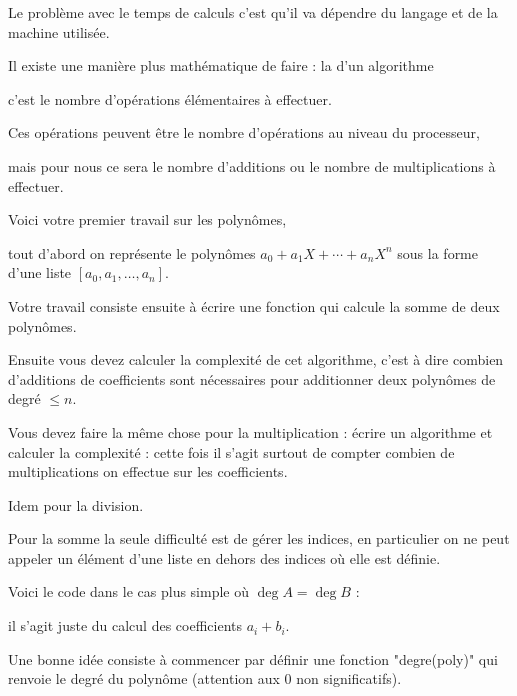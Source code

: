 \change

Le problème avec le temps de calculs c'est qu'il va dépendre 
du langage et de la machine utilisée. 

\change

Il existe une manière plus mathématique de faire : 
la  d'un algorithme


\change

c'est le nombre d'opérations élémentaires à effectuer.

\change

Ces opérations peuvent être le nombre d'opérations au niveau du processeur, 

mais pour nous ce sera le nombre d'additions ou le nombre de multiplications
à effectuer.



\diapo


Voici votre premier travail sur les polynômes,

tout d'abord on représente le polynômes $a_0+a_1X+\cdots + a_n X^n$ 
sous la forme d'une liste $[a_0,a_1,\ldots,a_n]$.


Votre travail consiste ensuite à écrire une fonction qui calcule la somme 
de deux polynômes.

Ensuite vous devez calculer la complexité de cet algorithme, c'est à dire combien d'additions
de coefficients sont nécessaires pour additionner deux polynômes de degré $\le n$.

Vous devez faire la même chose pour la multiplication : écrire un algorithme et calculer la complexité :
cette fois il s'agit surtout de compter combien de multiplications  on effectue sur les coefficients.

Idem pour la division.



\diapo

Pour la somme la seule difficulté est de gérer les indices, en particulier on ne peut
  appeler un élément d'une liste en dehors des indices où elle est définie.
  
  Voici le code dans le cas plus simple où $\deg A = \deg B$ :  

  il s'agit juste du calcul des coefficients $a_i+b_i$.
  
  \change 
 
 
  Une bonne idée consiste à commencer par définir une fonction "degre(poly)"
  qui renvoie le degré du polynôme (attention aux $0$ non significatifs).


